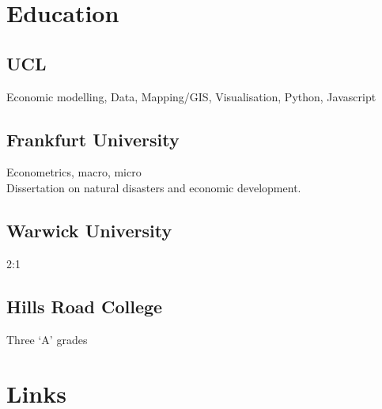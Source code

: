 \documentclass[a4paper,nomath]{deedy-resume} %
\begin{document}
\begin{paracol}{2}

    \section{Education} 
    
    \subsection{UCL}
    
    Economic modelling, Data, Mapping/GIS, Visualisation, Python, Javascript
    \sectionspace

    \subsection{Frankfurt University}

    Econometrics, macro, micro\\
    Dissertation on natural disasters and economic development.
    \sectionspace %

    \subsection{Warwick University}
    2:1
    \sectionspace %


    \subsection{Hills Road College}
    Three `A' grades\\
    \sectionspace %


    \section{Links} 


\end{paracol}
\end{document}
